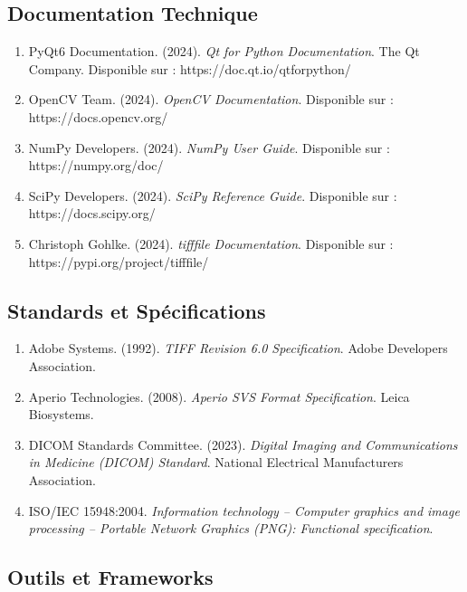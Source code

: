 \documentclass[12pt,a4paper]{article}
\begin{document}
\subsection{Documentation Technique}

\begin{enumerate}
\item PyQt6 Documentation. (2024). \textit{Qt for Python Documentation}. The Qt Company. Disponible sur : https://doc.qt.io/qtforpython/

\item OpenCV Team. (2024). \textit{OpenCV Documentation}. Disponible sur : https://docs.opencv.org/

\item NumPy Developers. (2024). \textit{NumPy User Guide}. Disponible sur : https://numpy.org/doc/

\item SciPy Developers. (2024). \textit{SciPy Reference Guide}. Disponible sur : https://docs.scipy.org/

\item Christoph Gohlke. (2024). \textit{tifffile Documentation}. Disponible sur : https://pypi.org/project/tifffile/
\end{enumerate}

\subsection{Standards et Spécifications}

\begin{enumerate}
\item Adobe Systems. (1992). \textit{TIFF Revision 6.0 Specification}. Adobe Developers Association.

\item Aperio Technologies. (2008). \textit{Aperio SVS Format Specification}. Leica Biosystems.

\item DICOM Standards Committee. (2023). \textit{Digital Imaging and Communications in Medicine (DICOM) Standard}. National Electrical Manufacturers Association.

\item ISO/IEC 15948:2004. \textit{Information technology -- Computer graphics and image processing -- Portable Network Graphics (PNG): Functional specification}.
\end{enumerate}

\subsection{Outils et Frameworks}
\end{document}
